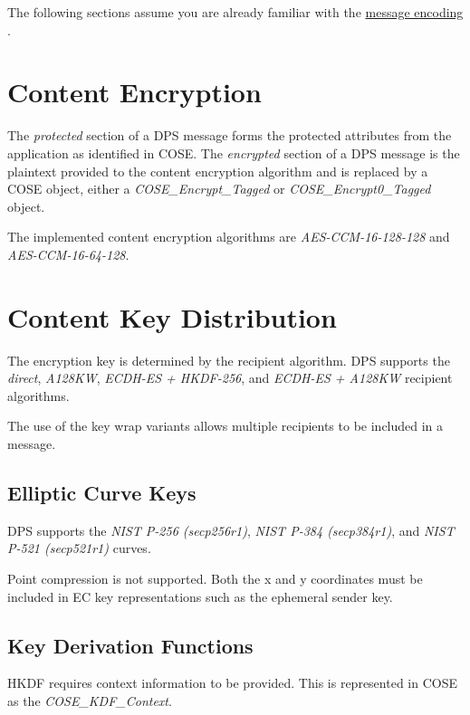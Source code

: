The following sections assume you are already familiar with the \hyperlink{message-types-and-flow_message-encoding}{message encoding }.\hypertarget{security_content-encryption}{}\section{Content Encryption}\label{security_content-encryption}
The {\itshape protected} section of a D\+PS message forms the protected attributes from the application as identified in C\+O\+SE. The {\itshape encrypted} section of a D\+PS message is the plaintext provided to the content encryption algorithm and is replaced by a C\+O\+SE object, either a {\itshape C\+O\+S\+E\+\_\+\+Encrypt\+\_\+\+Tagged} or {\itshape C\+O\+S\+E\+\_\+\+Encrypt0\+\_\+\+Tagged} object.

The implemented content encryption algorithms are {\itshape A\+E\+S-\/\+C\+C\+M-\/16-\/128-\/128} and {\itshape A\+E\+S-\/\+C\+C\+M-\/16-\/64-\/128}.\hypertarget{security_content-key-distribution}{}\section{Content Key Distribution}\label{security_content-key-distribution}
The encryption key is determined by the recipient algorithm. D\+PS supports the {\itshape direct}, {\itshape A128\+KW}, {\itshape E\+C\+D\+H-\/\+ES + H\+K\+D\+F-\/256}, and {\itshape E\+C\+D\+H-\/\+ES + A128\+KW} recipient algorithms.

The use of the key wrap variants allows multiple recipients to be included in a message.\hypertarget{security_elliptic-curve-keys}{}\subsection{Elliptic Curve Keys}\label{security_elliptic-curve-keys}
D\+PS supports the {\itshape N\+I\+ST P-\/256 (secp256r1)}, {\itshape N\+I\+ST P-\/384 (secp384r1)}, and {\itshape N\+I\+ST P-\/521 (secp521r1)} curves.

Point compression is not supported. Both the x and y coordinates must be included in EC key representations such as the ephemeral sender key.\hypertarget{security_key-derivation-functions}{}\subsection{Key Derivation Functions}\label{security_key-derivation-functions}
H\+K\+DF requires context information to be provided. This is represented in C\+O\+SE as the {\itshape C\+O\+S\+E\+\_\+\+K\+D\+F\+\_\+\+Context}.

